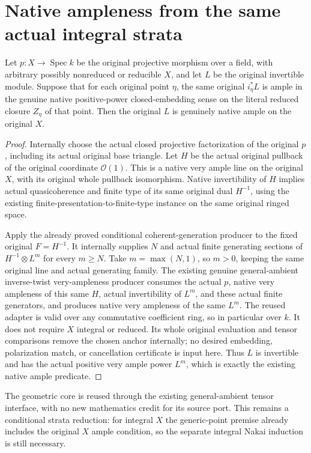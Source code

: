 \section{Native ampleness from the same actual integral strata}
\begin{theorem}
\label{thm:seshadri-original-strata-native-ampleness}
\leanok
Let $p:X\to\operatorname{Spec}k$ be the original projective morphism over
a field, with arbitrary possibly nonreduced or reducible $X$, and let $L$
be the original invertible module. Suppose that for each original point
$\eta$, the same original $i_\eta^*L$ is ample in the genuine native
positive-power closed-embedding sense on the literal reduced closure
$Z_\eta$ of that point. Then the original $L$ is genuinely native ample
on the original $X$.
\end{theorem}
\begin{proof}
Internally choose the actual closed projective factorization of the
original $p$, including its actual original base triangle. Let $H$ be
the actual original pullback of the original coordinate $\mathcal O(1)$.
This is a native very ample line on the original $X$, with its original
whole pullback isomorphism. Native invertibility of $H$ implies actual
quasicoherence and finite type of its same original dual $H^{-1}$, using
the existing finite-presentation-to-finite-type instance on the same
original ringed space.

Apply the already proved conditional coherent-generation producer to
the fixed original $F=H^{-1}$. It internally supplies $N$ and actual
finite generating sections of $H^{-1}\otimes L^m$ for every $m\geq N$.
Take $m=\max(N,1)$, so $m>0$, keeping the same original line and actual
generating family. The existing genuine general-ambient inverse-twist
very-ampleness producer consumes the actual $p$, native very ampleness
of this same $H$, actual invertibility of $L^m$, and these actual finite
generators, and produces native very ampleness of the same $L^m$.
The reused adapter is valid over any commutative coefficient ring, so
in particular over $k$. It does not require $X$ integral or reduced.
Its whole original evaluation and tensor
comparisons remove the chosen anchor internally; no desired embedding,
polarization match, or cancellation certificate is input here.
Thus $L$ is invertible and has the actual positive very ample power $L^m$,
which is exactly the existing native ample predicate.
\end{proof}

The geometric core is reused through the existing general-ambient tensor
interface, with no new mathematics credit for its source port. This
remains a conditional
strata reduction: for integral $X$ the generic-point premise already
includes the original $X$ ample condition, so the separate integral
Nakai induction is still necessary.
